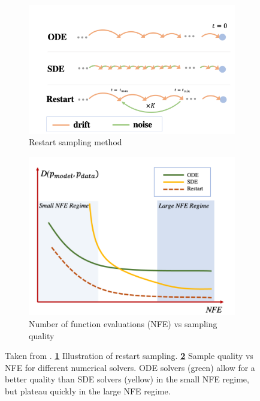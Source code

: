 \begin{figure}[htbp]
    \centering
    \begin{subfigure}{0.45\textwidth}
        \centering
        \includegraphics[width=\linewidth]{gfx/restart_sampling.png} %
        \caption{Restart sampling method}
        \label{fig:restart_sampling}
    \end{subfigure}\hfill
    \begin{subfigure}{0.45\textwidth}
        \centering
        \includegraphics[width=\linewidth]{gfx/nfe_quality.png} %
        \caption{Number of function evaluations (NFE) vs sampling quality}
        \label{fig:nfe_quality}
    \end{subfigure}
    \caption{Taken from \citep{xu_restart_2023}. \textbf{\ref*{fig:restart_sampling}} Illustration of restart sampling. \textbf{\ref*{fig:nfe_quality}} Sample quality vs NFE for different numerical solvers. ODE solvers (green) allow for a better quality than SDE solvers (yellow) in the small NFE regime, but plateau quickly in the large NFE regime.}
    \label{fig:restart_sampling_nfe_quality}
\end{figure}
